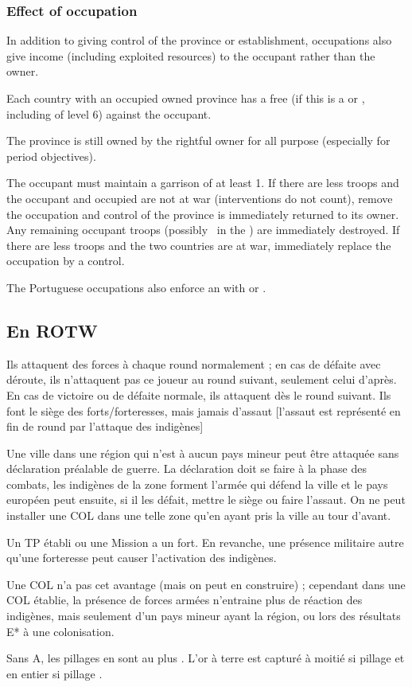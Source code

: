 \subsubsection{Effect of occupation}
\aparag In addition to giving control of the province or
establishment, occupations also give income (including exploited
resources) to the occupant rather than the owner.

\aparag Each country with an occupied owned province has a free \CB (\OCB if
this is a \COL or \TP, including \COL of level 6) against the occupant.

\aparag The province is still owned by the rightful owner for all \VPs
purpose (especially for period objectives).

\aparag The occupant must maintain a garrison of at least 1\LD.
\bparag If there are less troops and the occupant and occupied are not at war
(interventions do not count), remove the occupation and control of the
province is immediately returned to its owner. Any remaining occupant troops
(possibly \de\ in the \ROTW) are immediately destroyed.
\bparag If there are less troops and the two countries are at war,
immediately replace the occupation by a control.

\aparag The Portuguese occupations also enforce an \dipAT with
\paysOman or \paysAden.

\subsection{En ROTW}

Ils attaquent des forces à chaque round normalement ; en cas
de défaite avec déroute, ils n'attaquent pas ce joueur au
round suivant, seulement celui d'après. En cas de victoire
ou de défaite normale, ils attaquent dès le round suivant.
Ils font le siège des forts/forteresses, mais jamais d'assaut
[l'assaut est représenté en fin de round par l'attaque des indigènes]

\aparag Une ville dans une région qui n'est à aucun pays mineur peut
être attaquée sans déclaration préalable de guerre. La déclaration
doit se faire à la phase des combats, les indigènes de la zone
forment l'armée qui défend la ville et le pays européen peut
ensuite, si il les défait, mettre le siège ou faire l'assaut.
On ne peut installer une COL dans une telle zone qu'en ayant
pris la ville au tour d'avant.

\aparag Un TP établi ou une Mission a un fort. En revanche, une présence militaire
autre qu'une forteresse peut causer l'activation des indigènes.

\aparag Une COL n'a pas cet avantage (mais on peut en construire) ;
cependant dans une COL établie, la présence de forces armées
n'entraine plus de réaction des indigènes, mais
seulement d'un pays mineur ayant la région, ou lors des
résultats E* à une colonisation.

\aparag[Pillages]
\bparag Sans A, les pillages en \ROTW sont au plus \Facemoins.
\bparag L'or à terre est capturé à moitié si pillage \Facemoins et en
entier si pillage \Faceplus.

